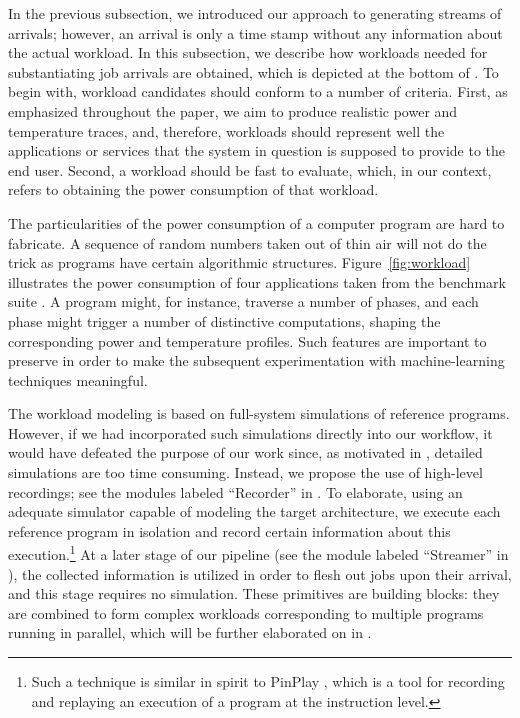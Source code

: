 
In the previous subsection, we introduced our approach to generating streams of
arrivals; however, an arrival is only a time stamp without any information about
the actual workload. In this subsection, we describe how workloads needed for
substantiating job arrivals are obtained, which is depicted at the bottom of
. To begin with, workload candidates should conform to a
number of criteria. First, as emphasized throughout the paper, we aim to produce
realistic power and temperature traces, and, therefore, workloads should
represent well the applications or services that the system in question is
supposed to provide to the end user. Second, a workload should be fast to
evaluate, which, in our context, refers to obtaining the power consumption of
that workload.

The particularities of the power consumption of a computer program are hard to
fabricate. A sequence of random numbers taken out of thin air will not do the
trick as programs have certain algorithmic structures.
Figure~\ref{fig:workload} illustrates the power consumption of four applications
taken from the  benchmark suite \cite{cpu2006}. A program
might, for instance, traverse a number of phases, and each phase might trigger a
number of distinctive computations, shaping the corresponding power and
temperature profiles. Such features are important to preserve in order to make
the subsequent experimentation with machine-learning techniques meaningful.

The workload modeling is based on full-system simulations of reference programs.
However, if we had incorporated such simulations directly into our workflow, it
would have defeated the purpose of our work since, as motivated in
, detailed simulations are too time consuming. Instead, we
propose the use of high-level recordings; see the modules labeled ``Recorder''
in . To elaborate, using an adequate simulator capable of
modeling the target architecture, we execute each reference program in isolation
and record certain information about this execution.\footnote{Such a technique
is similar in spirit to PinPlay \cite{patil2010}, which is a tool for recording
and replaying an execution of a program at the instruction level.} At a later
stage of our pipeline (see the module labeled ``Streamer'' in
), the collected information is utilized in order to flesh out
jobs upon their arrival, and this stage requires no simulation. These primitives
are building blocks: they are combined to form complex workloads corresponding
to multiple programs running in parallel, which will be further elaborated on in
.

